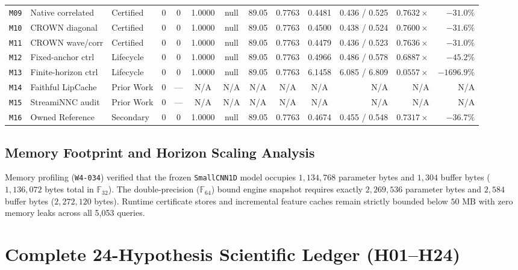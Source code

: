 \documentclass[11pt,a4paper]{article}
\newcommand{\F}{\mathbb{F}}
\newcommand{\code}[1]{{\small\ttfamily\nolinkurl{#1}}}
\theoremstyle{remark}
\begin{document}
\begin{table}[!htbp]
{\begin{tabular}{@{}lllrccccccrrr@{}}
\code{M09} & Native correlated & Certified & 0 & 0 & 1.0000 & null & 89.05 & 0.7763 & 0.4481 & 0.436 / 0.525 & $0.7632\times$ & $-31.0\%$ \\
\code{M10} & CROWN diagonal & Certified & 0 & 0 & 1.0000 & null & 89.05 & 0.7763 & 0.4500 & 0.438 / 0.524 & $0.7600\times$ & $-31.6\%$ \\
\code{M11} & CROWN wave/corr & Certified & 0 & 0 & 1.0000 & null & 89.05 & 0.7763 & 0.4479 & 0.436 / 0.523 & $0.7636\times$ & $-31.0\%$ \\
\code{M12} & Fixed-anchor ctrl & Lifecycle & 0 & 0 & 1.0000 & null & 89.05 & 0.7763 & 0.4966 & 0.486 / 0.578 & $0.6887\times$ & $-45.2\%$ \\
\code{M13} & Finite-horizon ctrl & Lifecycle & 0 & 0 & 1.0000 & null & 89.05 & 0.7763 & 6.1458 & 6.085 / 6.809 & $0.0557\times$ & $-1696.9\%$ \\
\code{M14} & Faithful LipCache & Prior Work & 0 & --- & N/A & N/A & N/A & N/A & N/A & N/A & N/A & N/A \\
\code{M15} & StreamiNNC audit & Prior Work & 0 & --- & N/A & N/A & N/A & N/A & N/A & N/A & N/A & N/A \\
\code{M16} & Owned Reference & Secondary & 0 & 0 & 1.0000 & null & 89.05 & 0.7763 & 0.4674 & 0.455 / 0.548 & $0.7317\times$ & $-36.7\%$ \\
\bottomrule
\end{tabular}%
}
\end{table}

\subsection{Memory Footprint and Horizon Scaling Analysis}
Memory profiling (\code{W4-034}) verified that the frozen \code{SmallCNN1D} model occupies $1,134,768$ parameter bytes and $1,304$ buffer bytes ($1,136,072$ bytes total in $\F_{32}$). The double-precision ($\F_{64}$) bound engine snapshot requires exactly $2,269,536$ parameter bytes and $2,584$ buffer bytes ($2,272,120$ bytes). Runtime certificate stores and incremental feature caches remain strictly bounded below $50\text{ MB}$ with zero memory leaks across all 5,053 queries.

\section{Complete 24-Hypothesis Scientific Ledger (H01--H24)}
\end{document}

